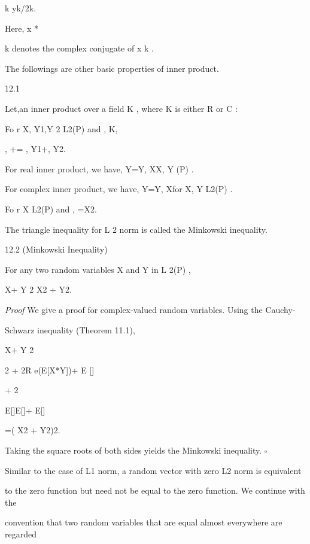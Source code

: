k yk/2k.

Here, x *

k denotes the complex conjugate of x k .

The followings are other basic properties of inner product.

\begin{thmbox}{12.1}
\end{thmbox}

Let\langle\cdot,\cdot\ranglebe an inner product over a field K , where K is either R or C :

Fo r X, Y1,Y 2 \in L2(P) and \alpha, \beta \in K,

\langleX,  +\rangle= \alpha\langleX, Y1\rangle+\beta\langleX, Y2\rangle.

For real inner product, we have\langleX, Y\rangle=\langle Y, X\ranglefor X, Y (P) .

For complex inner product, we have\langleX, Y\rangle=\langle Y, X\rangle* for X, Y \in L2(P) .

Fo r X \in L2(P) and \alpha \inK , =\vert \alpha\vert\cdot X2.

The triangle inequality for L 2 norm is called the Minkowski inequality.

\begin{thmbox}{12.2 (Minkowski Inequality)}
\end{thmbox}

For any two random variables X and Y in L 2(P) ,

X+ Y 2 \leq X2 + Y2.

\textit{Proof} We give a proof for complex-valued random variables. Using the Cauchy-

Schwarz inequality (Theorem 11.1),

X+ Y 2

2 + 2R e(E[X*Y])+ E [\vertY{}]

+ 2

\sqrt

E[\vertX{}]E[\vertY{}]+ E[\vertY{}]

=( X2 + Y2)2.

Taking the square roots of both sides yields the Minkowski inequality. \hfill $\square$

Similar to the case of L1 norm, a random vector with zero L2 norm is equivalent

to the zero function but need not be equal to the zero function. We continue with the

convention that two random variables that are equal almost everywhere are regarded

